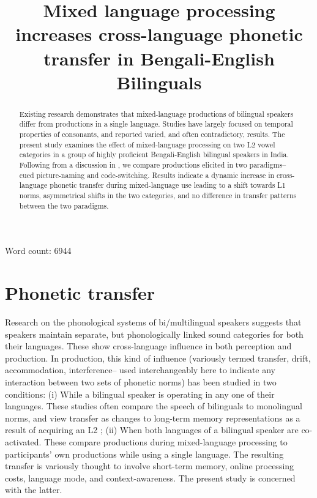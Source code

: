 \documentclass[charis,linguex]{glossa}
\title{Mixed language processing increases cross-language phonetic transfer in Bengali-English Bilinguals}
\begin{document}
\sffamily
\maketitle

Word count: 6944

\begin{abstract}
Existing research demonstrates that mixed-language productions of bilingual speakers differ from productions in a single language. Studies have largely focused on temporal properties of consonants, and reported varied, and often contradictory, results. The present study examines the effect of mixed-language processing on two L2 vowel categories in a group of highly proficient Bengali-English bilingual speakers in India. Following from a discussion in \citep{olson2013bilingual}, we compare productions elicited in two paradigms-- cued picture-naming and code-switching. Results indicate a dynamic increase in cross-language phonetic transfer during mixed-language use leading to a shift towards L1 norms, asymmetrical shifts in the two categories, and no difference in transfer patterns between the two paradigms. 
\end{abstract}

\begin{keywords}
  
\end{keywords}

\rmfamily


\section{Phonetic transfer}

Research on the phonological systems of bi/multilingual speakers suggests that speakers maintain separate, but phonologically linked sound categories for both their languages. These show cross-language influence in both perception and production.
In production, this kind of influence (variously termed transfer, drift, accommodation, interference-- used interchangeably here to indicate any interaction between two sets of phonetic norms) has been studied in two conditions:
(i) While a bilingual speaker is operating in any one of their languages. These studies often compare the speech of bilinguals to monolingual norms, and view transfer as changes to long-term memory representations as a result of acquiring an L2 \citep{guion2003vowel,caramazza1973acquisition,flege1987production}; (ii) When both languages of a bilingual speaker are co-activated. These compare productions during mixed-language processing to participants' own productions while using a single language. The resulting transfer is variously thought to involve short-term memory, online processing costs, language mode, and context-awareness. The present study is concerned with the latter. 
\end{document}
